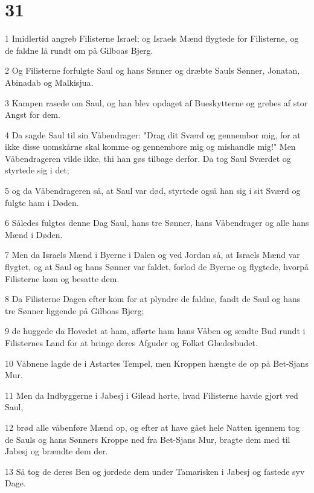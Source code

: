 \chapter{31}

\par 1 Imidlertid angreb Filisterne Israel; og Israels Mænd flygtede for Filisterne, og de faldne lå rundt om på Gilboas Bjerg.
\par 2 Og Filisterne forfulgte Saul og hans Sønner og dræbte Sauls Sønner, Jonatan, Abinadab og Malkisjua.
\par 3 Kampen rasede om Saul, og han blev opdaget af Bueskytterne og grebes af stor Angst for dem.
\par 4 Da sagde Saul til sin Våbendrager: "Drag dit Sværd og gennembor mig, for at ikke disse uomskårne skal komme og gennembore mig og mishandle mig!" Men Våbendrageren vilde ikke, thi han gøs tilbage derfor. Da tog Saul Sværdet og styrtede sig i det;
\par 5 og da Våbendrageren så, at Saul var død, styrtede også han sig i sit Sværd og fulgte ham i Døden.
\par 6 Således fulgtes denne Dag Saul, hans tre Sønner, hans Våbendrager og alle hans Mænd i Døden.
\par 7 Men da Israels Mænd i Byerne i Dalen og ved Jordan så, at Israels Mænd var flygtet, og at Saul og hans Sønner var faldet, forlod de Byerne og flygtede, hvorpå Filisterne kom og besatte dem.
\par 8 Da Filisterne Dagen efter kom for at plyndre de faldne, fandt de Saul og hans tre Sønner liggende på Gilboas Bjerg;
\par 9 de huggede da Hovedet at ham, afførte ham hans Våben og sendte Bud rundt i Filisternes Land for at bringe deres Afguder og Folket Glædesbudet.
\par 10 Våbnene lagde de i Astartes Tempel, men Kroppen hængte de op på Bet-Sjans Mur.
\par 11 Men da Indbyggerne i Jabesj i Gilead hørte, hvad Filisterne havde gjort ved Saul,
\par 12 brød alle våbenføre Mænd op, og efter at have gået hele Natten igennem tog de Sauls og hans Sønners Kroppe ned fra Bet-Sjans Mur, bragte dem med til Jabesj og brændte dem der.
\par 13 Så tog de deres Ben og jordede dem under Tamarisken i Jabesj og fastede syv Dage.


